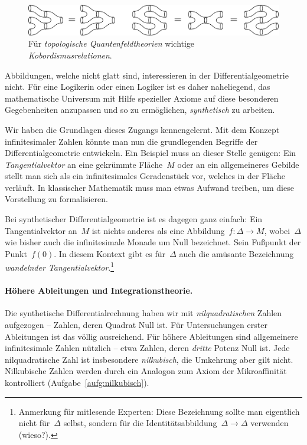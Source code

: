 \documentclass[twoside]{../zirkelblatt}
\theoremstyle{definition}
\theoremstyle{plain}
\theoremstyle{remark}
\begin{document}
\begin{figure}[b]
  \centering
  \includegraphics[scale=0.4]{cobordism}
  \caption{\label{fig:cobordism}Für \emph{topologische Quantenfeldtheorien}
  wichtige \emph{Kobordismusrelationen}.}
\end{figure}

Abbildungen, welche nicht glatt sind, interessieren in der
Differentialgeometrie nicht. Für eine Logikerin oder einen Logiker ist es daher
naheliegend, das mathematische Universum mit Hilfe spezieller Axiome auf diese
besonderen Gegebenheiten anzupassen und so zu ermöglichen, \emph{synthetisch}
zu arbeiten.

Wir haben die Grundlagen dieses Zugangs kennengelernt. Mit dem Konzept
infinitesimaler Zahlen könnte man nun die grundlegenden Begriffe der
Differentialgeometrie entwickeln. Ein Beispiel muss an dieser Stelle genügen:
Ein \emph{Tangentialvektor} an eine gekrümmte Fläche~$M$ oder an ein allgemeineres
Gebilde stellt man sich als ein infinitesimales Geradenstück vor, welches in
der Fläche verläuft. In klassischer Mathematik muss man etwas Aufwand treiben,
um diese Vorstellung zu formalisieren.

Bei synthetischer Differentialgeometrie ist es dagegen ganz einfach: Ein
Tangentialvektor an~$M$ ist nichts anderes als eine Abbildung~$f : \Delta \to M$,
wobei~$\Delta$ wie bisher auch die in\-fi\-ni\-te\-si\-ma\-le Monade um Null bezeichnet.
Sein Fußpunkt der Punkt~$f(0)$. In diesem Kontext gibt es für~$\Delta$
auch die amüsante Bezeichnung \emph{wandelnder Tangentialvektor}.\footnote{Anmerkung für
mitlesende Experten: Diese Bezeichnung sollte man eigentlich nicht für~$\Delta$
selbst, sondern für die Identitätsabbildung~$\Delta \to \Delta$ verwenden
(wieso?).}


\paragraph{Höhere Ableitungen und Integrationstheorie.}
Die synthetische Differentialrechnung haben wir mit \emph{nilquadratischen}
Zahlen aufgezogen -- Zahlen, deren Quadrat Null ist. Für Untersuchungen erster
Ableitungen ist das völlig ausreichend. Für höhere Ableitungen sind
allgemeinere infinitesimale Zahlen nützlich -- etwa Zahlen, deren \emph{dritte} Potenz
Null ist. Jede nilquadratische Zahl ist insbesondere \emph{nilkubisch}, die
Umkehrung aber gilt nicht. Nilkubische Zahlen werden durch ein Analogon zum
Axiom der Mikroaffinität kontrolliert (Aufgabe~\ref{aufg:nilkubisch}).
\end{document}
